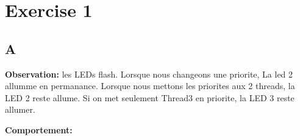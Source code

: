 \documentclass[12pt]{article}
\begin{document}
\section{Exercise 1}
\subsection{A}
\textbf{Observation: }
\newline
\noindent
les LEDs flash. Lorsque nous changeons une priorite, La led 2 allumme en permanance. Lorsque nous mettons les priorites aux 2 threads, la LED 2 reste allume.
Si on met seulement Thread3 en priorite, la LED 3 reste allumer.

\noindent
\textbf{Comportement: }
\newline
\noindent
\end{document}
